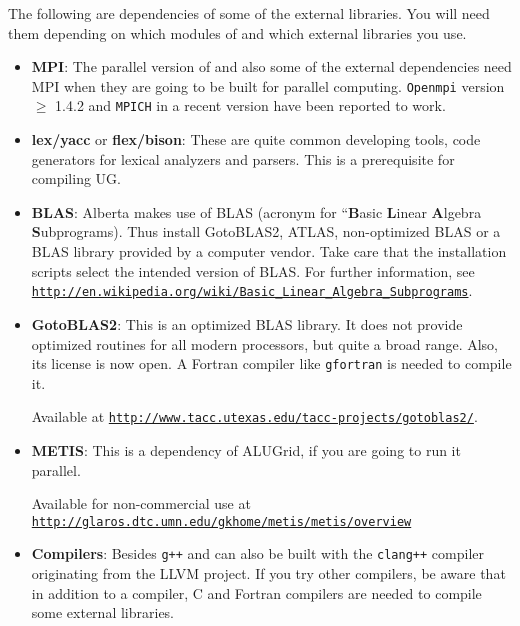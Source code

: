 The following are dependencies of some of the external libraries. You
will need them depending on which modules of \Dune and which external
libraries you use.

\begin{itemize}
\item \textbf{MPI}: The parallel version of \Dune and also some of the
  external dependencies need MPI when they are going to be built for
  parallel computing. \texttt{Openmpi} version $\geqslant$ 1.4.2 and
  \texttt{MPICH} in a recent version have been reported to work.

\item \textbf{lex/yacc} or \textbf{flex/bison}: These are quite common
  developing tools, code generators for lexical analyzers and
  parsers. This is a prerequisite for compiling UG.

\item \textbf{BLAS}: Alberta makes use of BLAS (acronym for
  ``\textbf{B}asic \textbf{L}inear \textbf{A}lgebra
  \textbf{S}ubprograms). Thus install GotoBLAS2, ATLAS,
  non-optimized BLAS or a BLAS library provided by a computer
  vendor. Take care that the installation scripts select the intended
  version of BLAS. For further information, see
  \texttt{\url{http://en.wikipedia.org/wiki/Basic_Linear_Algebra_Subprograms}}.

\item \textbf{GotoBLAS2}: This is an optimized BLAS library. It does
  not provide optimized routines for all modern processors, but quite
  a broad range. Also, its license is now open. A Fortran compiler
  like \texttt{gfortran} is needed to compile it.

  Available at
  \texttt{\url{http://www.tacc.utexas.edu/tacc-projects/gotoblas2/}}.

\item \textbf{METIS}: This is a dependency of ALUGrid, if you are
  going to run it parallel.
  
  Available for non-commercial use at
  \texttt{\url{http://glaros.dtc.umn.edu/gkhome/metis/metis/overview}}

\item \textbf{Compilers}: Besides \texttt{g++} \Dune and \eWoms can
  also be built with the \texttt{clang++} compiler originating from
  the LLVM project. If you try other compilers, be aware that in addition to a
  \Cplusplus compiler, C and Fortran compilers are needed to compile
  some external libraries.
\end{itemize}

